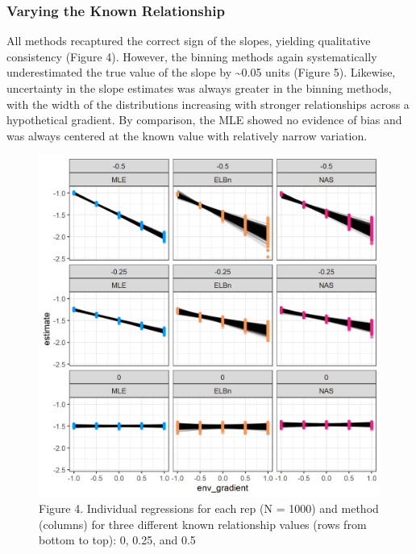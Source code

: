 \documentclass[
]{article}
\begin{document}
\hypertarget{varying-the-known-relationship}{%
\subsubsection{Varying the Known
Relationship}\label{varying-the-known-relationship}}

All methods recaptured the correct sign of the slopes, yielding
qualitative consistency (Figure 4). However, the binning methods again
systematically underestimated the true value of the slope by
\textasciitilde0.05 units (Figure 5). Likewise, uncertainty in the slope
estimates was always greater in the binning methods, with the width of
the distributions increasing with stronger relationships across a
hypothetical gradient. By comparison, the MLE showed no evidence of bias
and was always centered at the known value with relatively narrow
variation.

\begin{figure}
\centering
\includegraphics{figures/vary_beta_plot.png}
\caption{Figure 4. Individual regressions for each rep (N = 1000) and
method (columns) for three different known relationship values (rows
from bottom to top): 0, 0.25, and 0.5}
\end{figure}
\end{document}
